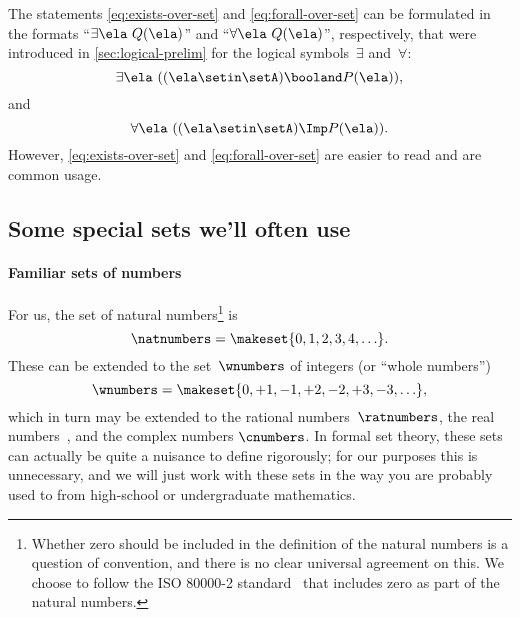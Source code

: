 \begin{remark}
    The statements \cref{eq:exists-over-set} and \cref{eq:forall-over-set} can be formulated in the formats ``$\exists \ela \ Q(\ela)$'' and ``$\forall \ela \ Q(\ela)$'', respectively, that were introduced in \cref{sec:logical-prelim} for the logical symbols~$\exists$ and~$\forall$:
    \begin{equation}
        \exists \ela \  ((\ela \setin \setA) \booland P(\ela)),
    \end{equation}
    and
    \begin{equation}
        \forall \ela\  ((\ela\setin \setA) \Imp P(\ela)).
    \end{equation}
    However, \cref{eq:exists-over-set} and \cref{eq:forall-over-set} are easier to read and are common usage.
\end{remark}

\subsection{Some special sets we'll often use}

\label{sec:special-sets}
\label{sec:natnumbers}
\label{sec:wnumbers}
\label{sec:ratnumbers}
\label{sec:reals}


\paragraph{Familiar sets of numbers}
For us, the set of natural numbers\footnote{
    Whether zero should be included in the definition of the natural numbers is a question of convention, and there is no clear universal agreement on this.
    We choose to follow the ISO 80000-2 standard~\cite{ISO:2009:IQU} that includes zero as part of the natural numbers.
} is
%
\begin{equation}
    \natnumbers = \makeset{0, 1, 2, 3, 4, \ldots }.
\end{equation}
%
These can be extended to the set~$\wnumbers$ of integers (or ``whole numbers'')
\begin{equation}
    \wnumbers = \makeset{ 0, +1, -1, +2, -2, +3, -3, \ldots},
\end{equation}
%
which in turn may be extended to the  rational numbers~$\ratnumbers$, the real numbers~\reals, and the complex numbers $\cnumbers$. In formal set theory, these sets can actually be quite a nuisance to define rigorously; for our purposes this is unnecessary, and we will just work with these sets in the way you are probably used to from high-school or undergraduate mathematics.

